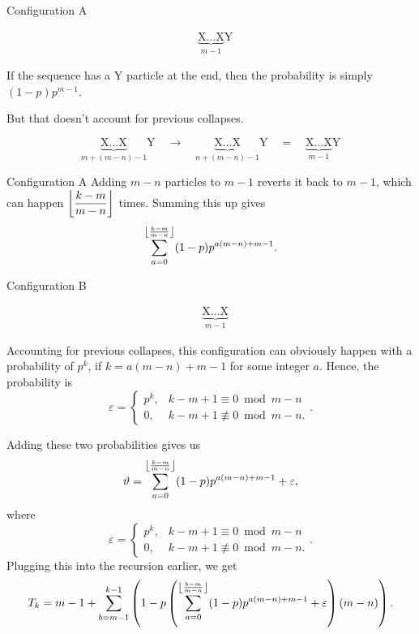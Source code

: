 \documentclass[xcolor={usenames,dvipsnames}]{beamer}
\DeclarePairedDelimiter\floor{\lfloor}{\rfloor}
\begin{document}
\begin{frame}{Configuration A}
    \begin{figure}[H]
    \vspace{-1.5em}
    \begin{align*}
        &\underbrace{\text{X}\dots\text{X}}_{m-1}\text{Y} \tag{A}
    \end{align*}
    \vspace{-2em}
  \end{figure}

  If the sequence has a Y particle at the end, then the probability is simply $(1-p)p^{m-1}$.

  But that doesn't account for previous collapses.
  \begin{figure}[H]
      \vspace{-1.5em}
      \begin{equation*}
        \underbrace{\text{X}\dots\text{X}}_{m + (m-n) - 1}\text{Y} \quad \longrightarrow \quad \underbrace{\text{X}\dots\text{X}}_{n+(m-n)-1}\text{Y}\quad = \quad \underbrace{\text{X}\dots\text{X}}_{m-1}\text{Y} 
      \end{equation*}
      \vspace{-2em}
    \end{figure}
  \end{frame}
  \begin{frame}{Configuration A}
    Adding $m-n$ particles to $m-1$ reverts it back to $m-1$, which can happen $\floor*{\dfrac{k-m}{m-n}}$ times. Summing this up gives \[\sum_{a = 0}^{\floor*{\frac{k-m}{m-n}}} (1-p)p^{a(m-n) + m-1}.\]
\end{frame}
\begin{frame}{Configuration B}
    \begin{figure}[H]
    \vspace{-1.5em}
    \begin{align*}
        &\underbrace{\text{X}\dots\text{X}}_{m-1} \tag{B}
    \end{align*}
    \vspace{-2em}
  \end{figure}
  Accounting for previous collapses, this configuration can obviously happen with a probability of $p^{k}$, if $k = a(m-n) + m-1$ for some integer $a$. Hence, the probability is \[
    \varepsilon = \begin{cases} p^{k}, &k-m+1 \equiv 0 \bmod m-n \\ 0, &k-m+1 \not\equiv 0 \bmod m-n. \end{cases}
  .\] 
\end{frame}
\begin{frame}
  Adding these two probabilities gives us \[
    \vartheta = \sum_{a=0}^{\floor*{\frac{k-m}{m-n}}} (1-p)p^{a(m-n)+m-1} + \varepsilon,
  \] where \[
    \varepsilon = \begin{cases} p^{k}, &k-m+1 \equiv 0 \bmod m-n \\ 0, &k-m+1 \not\equiv 0 \bmod m-n. \end{cases}
  .\] Plugging this into the recursion earlier, we get \[
    T_k = m-1+\sum _{b=m-1}^{k-1} \left(1-p \left(\sum _{a=0}^{\floor*{\frac{b-m}{m-n}} } (1-p) p^{a (m-n)+m-1}+\varepsilon\right) (m-n)\right)
  .\] 
\end{frame}
\end{document}

